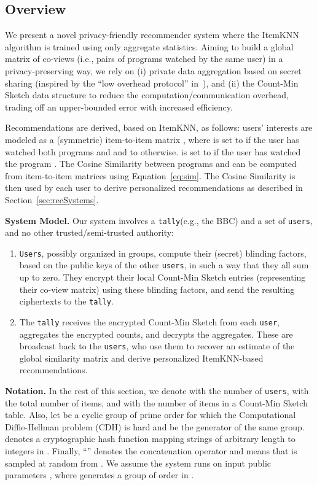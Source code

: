 \documentclass[conference]{IEEEtran}
\newcommand{\descr}[1]{\medskip \noindent \textbf{#1}}
\newcommand{\user}{{\tt user}\xspace}
\newcommand{\users}{{\tt users}\xspace}
\newcommand{\Users}{{\tt Users}\xspace}
\newcommand{\tally}{{\tt tally}\xspace}
\begin{document}
\subsection{Overview}
\label{subsec:secret}
We present a novel privacy-friendly recommender system where the ItemKNN algorithm is trained using only aggregate statistics. Aiming to build a global matrix of co-views (i.e., pairs of programs watched by the same user) in a privacy-preserving way, we rely on (i) private data aggregation based on secret sharing (inspired by the ``low overhead protocol'' in~\cite{Kursawe:2011}), and (ii) the Count-Min Sketch data structure to reduce the computation/communication overhead, trading off an upper-bounded error with increased efficiency.

Recommendations are derived, based on ItemKNN, as follows: users' interests are modeled as a (symmetric) item-to-item matrix , where  is set to  if the user has watched both  programs  and  and to  otherwise.
 is set to  if the user has watched the program .
The Cosine Similarity  between programs  and  can be computed from item-to-item matrices using Equation~\ref{eq:sim}.
The Cosine Similarity is then used by each user to derive personalized recommendations as described in Section~\ref{sec:recSystems}. 

\descr{System Model.} Our system involves a \tally (e.g., the BBC) and a set of \users, and no other trusted/semi-trusted authority: 


\begin{enumerate}
\itemsep0em
\item{\Users}, possibly organized in groups, compute their (secret) blinding factors, based on the public keys of the other \users, in such a way that they all sum up to zero. They encrypt their local Count-Min Sketch entries (representing their co-view matrix) using these blinding factors, and send the resulting ciphertexts to the \tally. \smallskip

\item The {\tally} receives the encrypted Count-Min Sketch from each \user, aggregates the encrypted counts, and decrypts the aggregates. These are broadcast back to the \users, who use them to recover an estimate of the global similarity matrix and derive personalized ItemKNN-based recommendations.


\end{enumerate}

\descr{Notation.} In the rest of this section, we denote with  the number of \users, with  the total number of items, and with  the number of items in a Count-Min Sketch table.
Also, let  be a cyclic group of prime order  for which the Computational Diffie-Hellman problem (CDH) is hard and  be the generator of the same group. 
 denotes a cryptographic hash function mapping strings of arbitrary length to integers in . Finally, ``'' denotes the concatenation operator and  means that  is sampled at random from .
We assume the system runs on input public parameters , where  generates a group of order  in . 
\end{document}

